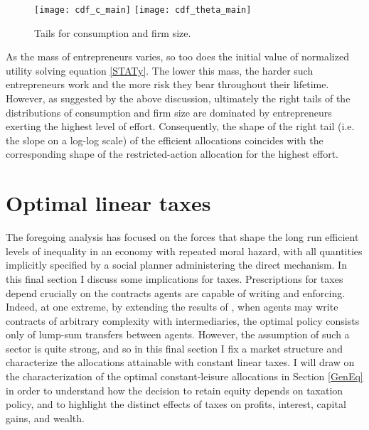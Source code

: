 \documentclass[11pt]{article}
\theoremstyle{plain}
\begin{document}
\begin{figure}[!htb]
\centering
\texttt{[image: cdf\_c\_main]}
\texttt{[image: cdf\_theta\_main]}
\caption{Tails for consumption and firm size.}\label{fig:tails_dist}
\end{figure}

As the mass of entrepreneurs varies, so too does the initial value of normalized utility solving equation \eqref{STATy}. The lower this mass, the harder such entrepreneurs work and the more risk they bear throughout their lifetime. However, as suggested by the above discussion, ultimately the right tails of the distributions of consumption and firm size are dominated by entrepreneurs exerting the highest level of effort. Consequently, the shape of the right tail (i.e. the slope on a log-log scale) of the efficient allocations coincides with the corresponding shape of the restricted-action allocation for the highest effort.  

\section{Optimal linear taxes} \label{Imp}

The foregoing analysis has focused on the forces that shape the long run efficient levels of inequality in an economy with repeated moral hazard, with all quantities implicitly specified by a social planner administering the direct mechanism. In this final section I discuss some implications for taxes. Prescriptions for taxes depend crucially on the contracts agents are capable of writing and enforcing. Indeed, at one extreme, by extending the results of \cite{atkeson_efficient_1992}, when agents may write contracts of arbitrary complexity with intermediaries, the optimal policy consists only of lump-sum transfers between agents. However, the assumption of such a sector is quite strong, and so in this final section I fix a market structure and characterize the allocations attainable with constant linear taxes. I will draw on the characterization of the optimal constant-leisure allocations in Section \ref{GenEq} in order to understand how the decision to retain equity depends on taxation policy, and to highlight the distinct effects of taxes on profits, interest, capital gains, and wealth. 
\end{document}
